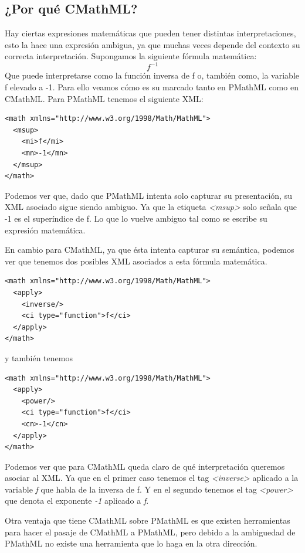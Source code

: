 \subsection{¿Por qué CMathML?}
Hay ciertas expresiones matemáticas que pueden tener distintas interpretaciones, esto la hace una expresión ambigua, ya que muchas veces
depende del contexto su correcta interpretación. Supongamos la siguiente fórmula matemática:
$$f^{-1}$$
Que puede interpretarse como la función inversa de f o, también como, la variable f elevado a -1. Para ello veamos cómo es su marcado tanto en PMathML como en CMathML.
Para PMathML tenemos el siguiente XML:
\lstset{language=XML}
\begin{lstlisting}
<math xmlns="http://www.w3.org/1998/Math/MathML">
  <msup>
    <mi>f</mi>
    <mn>-1</mn>
  </msup>
</math>
\end{lstlisting}

Podemos ver que, dado que PMathML intenta solo capturar su presentación, su XML asociado sigue siendo ambiguo. Ya que la etiqueta \textit{<msup>} solo
señala que -1 es el superíndice de f. Lo que lo vuelve ambiguo tal como se escribe su expresión matemática.

En cambio para CMathML, ya que ésta intenta capturar su semántica, podemos ver que tenemos dos posibles XML asociados a esta fórmula matemática.

\lstset{language=XML}
\begin{lstlisting}
<math xmlns="http://www.w3.org/1998/Math/MathML">
  <apply>
    <inverse/>
    <ci type="function">f</ci>
  </apply>
</math>
\end{lstlisting}

y también tenemos

\lstset{language=XML}
\begin{lstlisting}
<math xmlns="http://www.w3.org/1998/Math/MathML">
  <apply>
    <power/>
    <ci type="function">f</ci>
    <cn>-1</cn>
  </apply>
</math>
\end{lstlisting}

Podemos ver que para CMathML queda claro de qué interpretación queremos asociar al XML. Ya que en el primer caso tenemos el tag \textit{<inverse>}
aplicado a la variable \textit{f} que habla de la inversa de f. Y en el segundo tenemos el tag \textit{<power>} que denota el exponente \textit{-1} aplicado a \textit{f}.

Otra ventaja que tiene CMathML sobre PMathML es que existen herramientas para hacer el pasaje de CMathML a PMathML, pero debido a la ambiguedad de PMathML no existe una herramienta que lo haga en la otra dirección.

